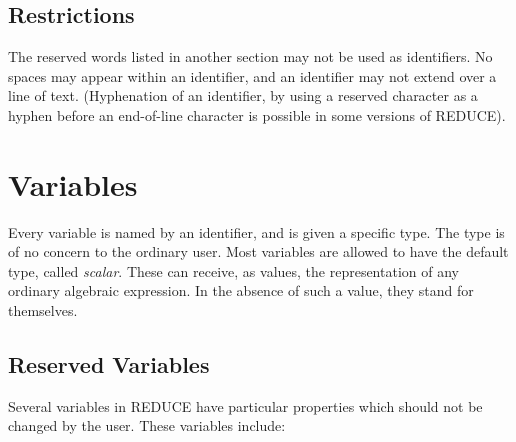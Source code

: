 \documentclass[11pt,letterpaper]{book}
\newcommand{\REDUCE}{REDUCE}
\begin{document}
\subsection*{Restrictions}

The reserved words listed in another section may not be used as
identifiers.  No spaces may appear within an identifier, and an identifier
may not extend over a line of text. (Hyphenation of an identifier, by
using a reserved character as a hyphen before an end-of-line character is
possible in some versions of {\REDUCE}).

\section{Variables}

Every variable is named by an identifier, and is given a
specific type.  The type is of no concern to the ordinary user.  Most
variables are allowed to have the default type, called {\em scalar}.
These can receive, as values, the representation of any ordinary algebraic
expression.  In the absence of such a value, they stand for themselves.

\subsection*{Reserved Variables}

Several variables in {\REDUCE} have particular
properties which should not be changed by the user.  These variables
include:
\end{document}
